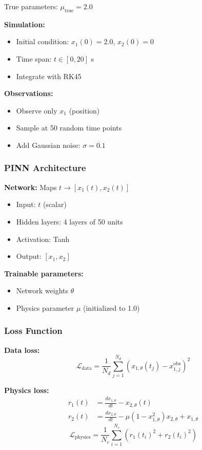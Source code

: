 True parameters: $\mu_{\text{true}} = 2.0$

\textbf{Simulation:}
\begin{itemize}
    \item Initial condition: $x_1(0) = 2.0$, $x_2(0) = 0$
    \item Time span: $t \in [0, 20]$ s
    \item Integrate with RK45
\end{itemize}

\textbf{Observations:}
\begin{itemize}
    \item Observe only $x_1$ (position)
    \item Sample at 50 random time points
    \item Add Gaussian noise: $\sigma = 0.1$
\end{itemize}

\subsubsection{PINN Architecture}

\textbf{Network:} Maps $t \to [x_1(t), x_2(t)]$
\begin{itemize}
    \item Input: $t$ (scalar)
    \item Hidden layers: 4 layers of 50 units
    \item Activation: Tanh
    \item Output: $[x_1, x_2]$
\end{itemize}

\textbf{Trainable parameters:}
\begin{itemize}
    \item Network weights $\theta$
    \item Physics parameter $\mu$ (initialized to 1.0)
\end{itemize}

\subsubsection{Loss Function}

\textbf{Data loss:}
\begin{equation}
\mathcal{L}_{\text{data}} = \frac{1}{N_d}\sum_{j=1}^{N_d} (x_{1,\theta}(t_j) - x_{1,j}^{\text{obs}})^2
\end{equation}

\textbf{Physics loss:}
\begin{align}
r_1(t) &= \frac{dx_{1,\theta}}{dt} - x_{2,\theta}(t) \\
r_2(t) &= \frac{dx_{2,\theta}}{dt} - \mu(1 - x_{1,\theta}^2)x_{2,\theta} + x_{1,\theta}
\end{align}
\begin{equation}
\mathcal{L}_{\text{physics}} = \frac{1}{N_c}\sum_{i=1}^{N_c} \left(r_1(t_i)^2 + r_2(t_i)^2\right)
\end{equation}

